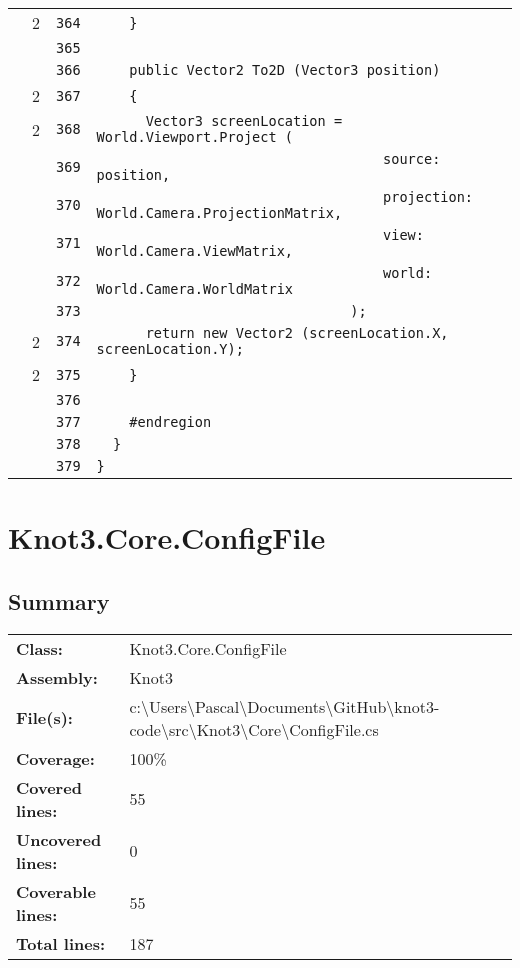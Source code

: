 \documentclass[a4paper,10pt]{article}
\begin{document}
\begin{longtable}[l]{lrrl}
\cellcolor{green} & 2 & \verb~364~ & \verb~    }~\\
\cellcolor{gray} &  & \verb~365~ & \verb~~\\
\cellcolor{gray} &  & \verb~366~ & \verb~    public Vector2 To2D (Vector3 position)~\\
\cellcolor{green} & 2 & \verb~367~ & \verb~    {~\\
\cellcolor{green} & 2 & \verb~368~ & \verb~      Vector3 screenLocation = World.Viewport.Project (~\\
\cellcolor{gray} &  & \verb~369~ & \verb~                                   source: position,~\\
\cellcolor{gray} &  & \verb~370~ & \verb~                                   projection: World.Camera.ProjectionMatrix,~\\
\cellcolor{gray} &  & \verb~371~ & \verb~                                   view: World.Camera.ViewMatrix,~\\
\cellcolor{gray} &  & \verb~372~ & \verb~                                   world: World.Camera.WorldMatrix~\\
\cellcolor{gray} &  & \verb~373~ & \verb~                               );~\\
\cellcolor{green} & 2 & \verb~374~ & \verb~      return new Vector2 (screenLocation.X, screenLocation.Y);~\\
\cellcolor{green} & 2 & \verb~375~ & \verb~    }~\\
\cellcolor{gray} &  & \verb~376~ & \verb~~\\
\cellcolor{gray} &  & \verb~377~ & \verb~    #endregion~\\
\cellcolor{gray} &  & \verb~378~ & \verb~  }~\\
\cellcolor{gray} &  & \verb~379~ & \verb~}~\\
\end{longtable}
\newpage
\section{Knot3.Core.ConfigFile}
\subsection{Summary}
\begin{longtable}[l]{ll}
\textbf{Class:} & Knot3.Core.ConfigFile\\
\textbf{Assembly:} & Knot3\\
\textbf{File(s):} & \begin{minipage}[t]{12cm}{c:\textbackslash Users\textbackslash Pascal\textbackslash Documents\textbackslash GitHub\textbackslash knot3-code\textbackslash src\textbackslash Knot3\textbackslash Core\textbackslash ConfigFile.cs}\end{minipage} \\
\textbf{Coverage:} & 100\%\\
\textbf{Covered lines:} & 55\\
\textbf{Uncovered lines:} & 0\\
\textbf{Coverable lines:} & 55\\
\textbf{Total lines:} & 187\\
\end{longtable}
\end{document}
